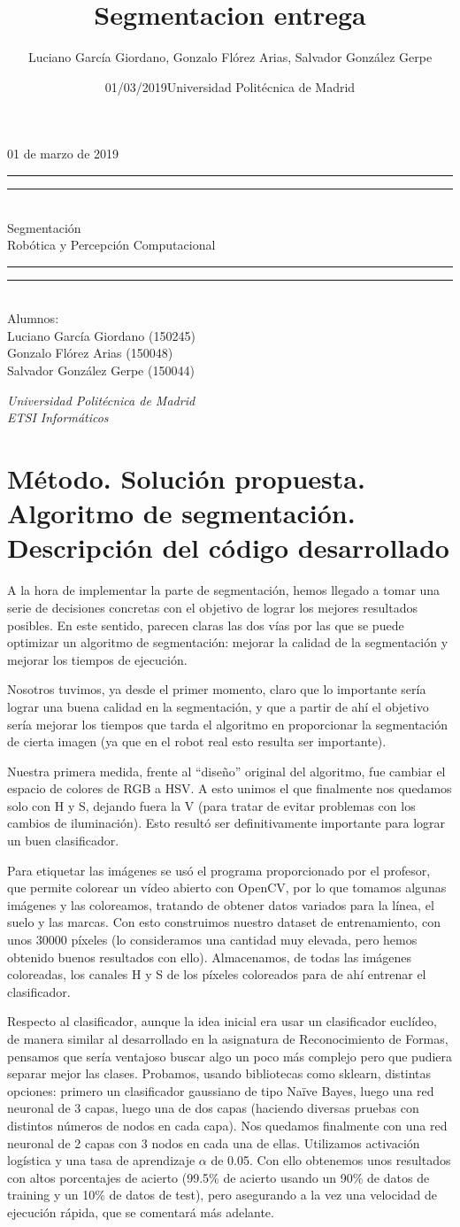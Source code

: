 \documentclass{article}
\title{Segmentacion entrega}
\author{Luciano García Giordano, Gonzalo Flórez Arias, Salvador González Gerpe}
\date{01/03/2019}
\date{Universidad Politécnica de Madrid}
\newcommand*{\frontPageEC}[2]{
    \begingroup %
        \centering %
        \vspace*{\baselineskip} %
        {\begin{flushright} \LARGE #1  \end{flushright}}
        \vspace*{\baselineskip}
        \rule{\textwidth}{1.6pt}\vspace*{-\baselineskip}\vspace*{2pt} %
        \rule{\textwidth}{0.4pt}\\[\baselineskip] %
        {\LARGE #2  \\[0.8\baselineskip] \large{Robótica y Percepción Computacional}}\\[0.2\baselineskip] %
        \rule{\textwidth}{0.4pt}\vspace*{-\baselineskip}\vspace{3.2pt} %
        \rule{\textwidth}{1.6pt}\\[\baselineskip] %
        \vspace*{2\baselineskip} %
        Alumnos: \\[\baselineskip]
        {\Large Luciano García Giordano (150245)} \\
        {\Large Gonzalo Flórez Arias (150048)} \\
        {\Large Salvador González Gerpe (150044)} \\
        
        \vfill
        
        {\itshape Universidad Politécnica de Madrid \\ ETSI Informáticos\par} %
    \endgroup}
\begin{document}
\frontPageEC{01 de marzo de 2019}{Segmentación}
\thispagestyle{empty}

\newpage
\tableofcontents
\setcounter{page}{1}

\clearpage
\newpage

\section{Método. Solución propuesta. Algoritmo de segmentación. Descripción del código desarrollado}

	A la hora de implementar la parte de segmentación, hemos llegado a tomar una serie de decisiones concretas con el objetivo de lograr los mejores resultados posibles. En este sentido, parecen claras las dos vías por las que se puede optimizar un algoritmo de segmentación: mejorar la calidad de la segmentación y mejorar los tiempos de ejecución.

	Nosotros tuvimos, ya desde el primer momento, claro que lo importante sería lograr una buena calidad en la segmentación, y que a partir de ahí el objetivo sería mejorar los tiempos que tarda el algoritmo en proporcionar la segmentación de cierta imagen (ya que en el robot real esto resulta ser importante). 

	Nuestra primera medida, frente al “diseño” original del algoritmo, fue cambiar el espacio de colores de RGB a HSV. A esto unimos el que finalmente nos quedamos solo con H y S, dejando fuera la V (para tratar de evitar problemas con los cambios de iluminación). Esto resultó ser definitivamente importante para lograr un buen clasificador.

	Para etiquetar las imágenes se usó el programa proporcionado por el profesor, que permite colorear un vídeo abierto con OpenCV, por lo que tomamos algunas imágenes y las coloreamos, tratando de obtener datos variados para la línea, el suelo y las marcas. Con esto construimos nuestro dataset de entrenamiento, con unos 30000 píxeles (lo consideramos una cantidad muy elevada, pero hemos obtenido buenos resultados con ello). Almacenamos, de todas las imágenes coloreadas, los canales H y S de los píxeles coloreados para de ahí entrenar el clasificador.

	Respecto al clasificador, aunque la idea inicial era usar un clasificador euclídeo, de manera similar al desarrollado en la asignatura de Reconocimiento de Formas, pensamos que sería ventajoso buscar algo un poco más complejo pero que pudiera separar mejor las clases. Probamos, usando bibliotecas como sklearn, distintas opciones: primero un clasificador gaussiano de tipo Naïve Bayes, luego una red neuronal de 3 capas, luego una de dos capas (haciendo diversas pruebas con distintos números de nodos en cada capa). Nos quedamos finalmente con una red neuronal de 2 capas con 3 nodos en cada una de ellas. Utilizamos activación logística y una tasa de aprendizaje $\alpha$ de 0.05. Con ello obtenemos unos resultados con altos porcentajes de acierto (99.5\% de acierto usando un 90\% de datos de training y un 10\% de datos de test), pero asegurando a la vez una velocidad de ejecución rápida, que se comentará más adelante.
\end{document}
